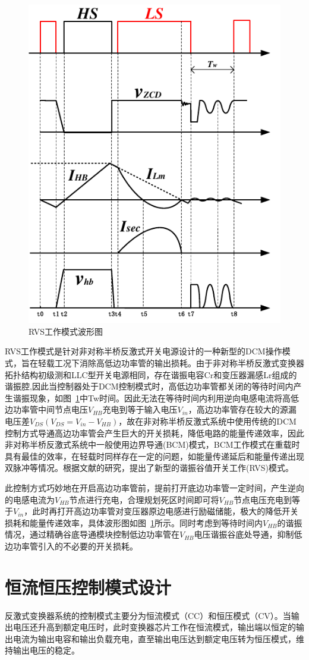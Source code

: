 \begin{figure}[htbp] 
    \centering
    \includegraphics[width=0.6\linewidth]{figures/RVS波形图.pdf}
    \caption{RVS工作模式波形图}
    \label{fig:RVS波形图}
\end{figure}

RVS工作模式是针对非对称半桥反激式开关电源设计的一种新型的DCM操作模式，旨在轻载工况下消除高低边功率管的输出损耗。由于非对称半桥反激式变换器拓扑结构初级测和LLC型开关电源相同，存在谐振电容Cr和变压器漏感Lr组成的谐振腔,因此当控制器处于DCM控制模式时，高低边功率管都关闭的等待时间内产生谐振现象，如图~\ref{fig:RVS波形图}中Tw时间。因此无法在等待时间内利用逆向电感电流将高低边功率管中间节点电压$V_{HB}$充电到等于输入电压$V_{in}$，高边功率管存在较大的源漏电压差$V_{DS}(V_{DS}=V_{in}-V_{HB})$，故在非对称半桥反激式系统中使用传统的DCM控制方式导通高边功率管会产生巨大的开关损耗，降低电路的能量传递效率，因此非对称半桥反激式系统中一般使用边界导通(BCM)模式，BCM工作模式在重载时具有最佳的效率，在轻载时同样存在一定的问题，如能量传递延后和能量传递出现双脉冲等情况。根据文献的研究，提出了新型的谐振谷值开关工作(RVS)模式。

此控制方式巧妙地在开启高边功率管前，提前打开底边功率管一定时间，产生逆向的电感电流为$V_{HB}$节点进行充电，合理规划死区时间即可将$V_{HB}$节点电压充电到等于$V_{in}$，此时再打开高边功率管对变压器原边电感进行励磁储能，极大的降低开关损耗和能量传递效率，具体波形图如图~\ref{fig:RVS波形图}所示。同时考虑到等待时间内$V_{HB}$的谐振情况，通过精确谷底导通模块控制低边功率管在$V_{HB}$电压谐振谷底处导通，抑制低边功率管引入的不必要的开关损耗。

\section{恒流恒压控制模式设计}
反激式变换器系统的控制模式主要分为恒流模式（CC）和恒压模式（CV）。当输出电压还升高到额定电压时，此时变换器芯片工作在恒流模式，输出端以恒定的输出电流为输出电容和输出负载充电，直至输出电压达到额定电压转为恒压模式，维持输出电压的稳定。
